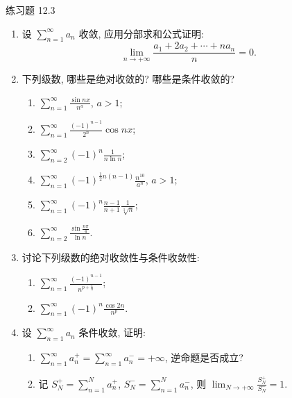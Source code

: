 \begin{exblock}{练习题 12.3}
\begin{enumerate}
\[    \qquad
    \sum_{n=1}^{\infty}\biggl\{\frac{(-1)^{n-1}}{\sqrt{n}}+\frac{1}{n}\biggr\}.
\]
  \item 设 $\sum_{n=1}^{\infty}a_{n}$ 收敛, 应用分部求和公式证明:
  \[
    \lim_{n\to+\infty}\frac{a_{1}+2a_{2}+\cdots+na_{n}}{n}=0.
\]
  \item 下列级数, 哪些是绝对收敛的? 哪些是条件收敛的?
  \begin{enumerate}
    \item $\displaystyle\sum_{n=1}^{\infty}\frac{\sin nx}{n^{a}}$, $a>1$;
    \item $\displaystyle\sum_{n=1}^{\infty}\frac{(-1)^{n-1}}{2^{n}}\cos nx$;
    \item $\displaystyle\sum_{n=2}^{\infty}(-1)^{n}\frac{1}{n\ln n}$;
    \item $\displaystyle\sum_{n=1}^{\infty}(-1)^{\frac{1}{2}n(n-1)}\frac{n^{10}}{a^{n}}$, $a>1$;
    \item $\displaystyle\sum_{n=1}^{\infty}(-1)^{n}\frac{n-1}{n+1}\frac{1}{\sqrt[3]{n}}$;
    \item $\displaystyle\sum_{n=2}^{\infty}\frac{\sin\frac{n\pi}{4}}{\ln n}$.
  \end{enumerate}
  \item 讨论下列级数的绝对收敛性与条件收敛性:
  \begin{enumerate}
    \item $\displaystyle\sum_{n=1}^{\infty}\frac{(-1)^{n-1}}{n^{p+\frac{1}{n}}}$;
    \item $\displaystyle\sum_{n=1}^{\infty}(-1)^{n}\frac{\cos 2n}{n^{p}}$.
  \end{enumerate}
  \item 设 $\sum_{n=1}^{\infty}a_{n}$ 条件收敛, 证明:
  \begin{enumerate}
    \item $\displaystyle\sum_{n=1}^{\infty}a_{n}^{+}=\sum_{n=1}^{\infty}a_{n}^{-}=+\infty$, 逆命题是否成立?
    \item 记 $S_{N}^{+}=\sum_{n=1}^{N}a_{n}^{+}$, $S_{N}^{-}=\sum_{n=1}^{N}a_{n}^{-}$, 则
          $\displaystyle\lim_{N\to+\infty}\frac{S_{N}^{+}}{S_{N}^{-}}=1$.
  \end{enumerate}
\end{enumerate}
\end{exblock}

